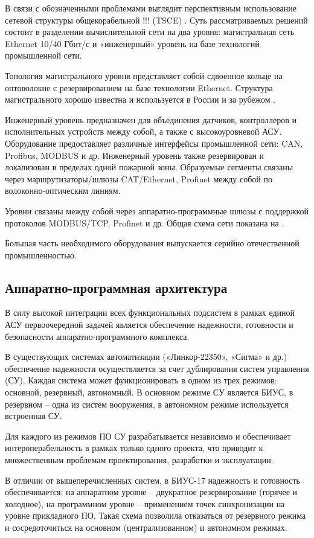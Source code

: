 \documentclass[paper=a4, fontsize=12pt, titlepage=false, twoside=false]{scrartcl}
\begin{document}
В связи с обозначенными проблемами выглядит перспективным использование
сетевой структуры общекорабельной !!! (TSCE) \cite{tsce}. Суть рассматриваемых
решений состоит в разделении вычислительной сети на два уровня: магистральная
сеть Ethernet 10/40 Гбит/с и «инженерный» уровень на базе технологий
промышленной сети.

Топология магистрального уровня представляет собой сдвоенное кольце на
оптоволокне с резервированием на базе технологии Ethernet. Структура магистрального
хорошо известна и используется в России и за рубежом \cite{gedms,gedmsv2}.

Инженерный уровень предназначен для объединения датчиков, контроллеров и
исполнительных устройств между собой, а также с высокоуровневой АСУ.
Оборудование предоставляет различные интерфейсы промышленной сети: CAN,
Profibus, MODBUS и др. Инженерный уровень также резервирован и локализован
в пределах одной пожарной зоны. Образуемые сегменты связаны через
маршрутизаторы/шлюзы CAT/Ethernet, Profinet между собой по
волоконно-оптическим линиям.

Уровни связаны между собой через аппаратно-программные шлюзы с поддержкой
протоколов MODBUS/TCP, Profinet и др. Общая схема сети показана на .

Большая часть необходимого оборудования выпускается серийно отечественной
промышленностью.

\subsection{Аппаратно-программная архитектура}

В силу высокой интеграции всех функциональных подсистем в рамках единой
АСУ первоочередной задачей является обеспечение надежности, готовности и
безопасности аппаратно-программного комплекса.

В существующих системах автоматизации («Линкор-22350», «Сигма» и др.)
обеспечение надежности осуществляется за счет дублирования систем 
управления (СУ). Каждая система может функционировать в одном из трех
режимов: основной, резервный, автономный. В основном режиме СУ
является БИУС, в резервном -- одна из систем вооружения, в автономном
режиме используется встроенная СУ.

Для каждого из режимов ПО СУ разрабатывается независимо и обеспечивает
интероперабельность в рамках только одного проекта, что
приводит к множественным проблемам проектирования, разработки и
эксплуатации.

В отличии от вышеперечисленных систем, в БИУС-17 надежность и
готовность обеспечивается: на аппаратном уровне -- двукратное
резервирование (горячее и холодное), на программном уровне --
применением точек синхронизации на уровне прикладного ПО.
Такая схема позволила отказаться от резервного режима и сосредоточиться
на основном (централизованном) и автономном режимах.
\end{document}
